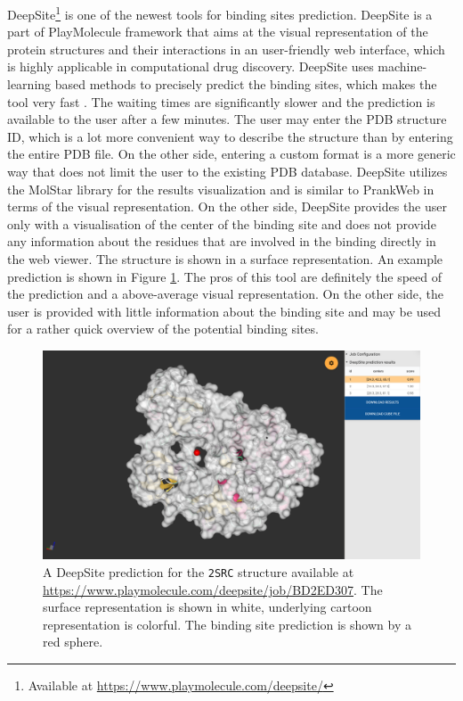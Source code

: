 DeepSite\footnote{Available at \url{https://www.playmolecule.com/deepsite/}} is one of the newest tools for binding sites prediction. DeepSite is a part of PlayMolecule framework that aims at the visual representation of the protein structures and their interactions in an user-friendly web interface\cite{martinez2017playmolecule}\cite{10.1093/bioinformatics/bty758}, which is highly applicable in computational drug discovery. DeepSite uses machine-learning based methods to precisely predict the binding sites, which makes the tool very fast \cite{10.1093/bioinformatics/btx350}. The waiting times are significantly slower and the prediction is available to the user after a few minutes. The user may enter the PDB structure ID, which is a lot more convenient way to describe the structure than by entering the entire PDB file. On the other side, entering a custom format is a more generic way that does not limit the user to the existing PDB database. DeepSite utilizes the MolStar library for the results visualization and is similar to PrankWeb in terms of the visual representation. On the other side, DeepSite provides the user only with a visualisation of the center of the binding site and does not provide any information about the residues that are involved in the binding directly in the web viewer. The structure is shown in a surface representation. An example prediction is shown in Figure \ref{fig:deepsite_prediction}. The pros of this tool are definitely the speed of the prediction and a above-average visual representation. On the other side, the user is provided with little information about the binding site and may be used for a rather quick overview of the potential binding sites.

\begin{figure}
    \centering
    \includegraphics[width=\linewidth]{img/deepsite_prediction.png}
    \caption{A DeepSite prediction for the \texttt{2SRC} structure available at \url{https://www.playmolecule.com/deepsite/job/BD2ED307}. The surface representation is shown in white, underlying cartoon representation is colorful. The binding site prediction is shown by a red sphere.}
    \label{fig:deepsite_prediction}
\end{figure}